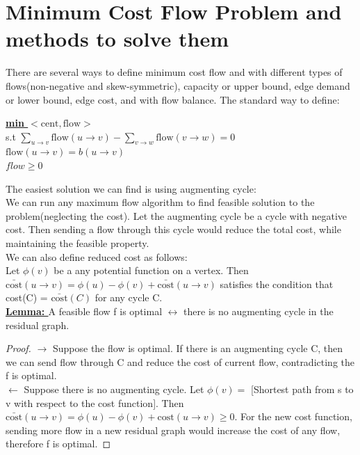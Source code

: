\documentclass{article}
\begin{document}
\section{Minimum Cost Flow Problem and methods to solve them}
There are several ways to define minimum cost flow and with different types of 
flows(non-negative and skew-symmetric), capacity or upper bound, edge demand or 
lower bound, edge cost, and with flow balance. The standard way to define:
\begin{center}
\begin{algorithm}
\textbf{\underline{min $< \text{cent}, \text{flow}>$}} \\
  s.t  $\sum \limits_{u \rightarrow v} \text{flow} 
  (u \rightarrow v) - \sum \limits_{v \rightarrow w} \text{flow} (v \rightarrow w)= 0 $  \\ 
  \qquad
       $\text{flow}(u \rightarrow v) = b(u \rightarrow v)$ \\ \qquad
       $flow \geq 0$
\end{algorithm}
\end{center}

The easiest solution we can find is using augmenting cycle: \\
We can run any maximum flow algorithm to find feasible solution to the 
problem(neglecting the cost). Let the augmenting cycle be a cycle with negative cost. 
Then sending a flow through this cycle would reduce the total cost, while 
maintaining the feasible property.  \\
We can also define reduced cost as follows: \\
Let $\phi(v)$ be a any potential function on a vertex. Then 
$\bar{\text{cost}}(u \rightarrow v) = \phi(u) - \phi(v) + \bar{\text{cost}} (u \rightarrow v)$ 
satisfies the condition that cost(C) =  $\bar{\text{cost}}(C)$ for any cycle C.\\

\textbf{\underline{Lemma: }} A feasible flow f is optimal $\leftrightarrow$ there 
is no augmenting cycle in the residual graph. \\

\begin{proof}
$\rightarrow$ Suppose the flow is optimal. If there is an augmenting cycle C, 
then we can send flow through C and reduce the cost of current flow, contradicting the f is optimal. \\
$\leftarrow$ Suppose there is no augmenting cycle. Let $\phi(v) = $ 
[Shortest path from s to v with respect to the cost function]. Then 
$\bar{\text{cost}}(u \rightarrow v) = \phi(u) - \phi(v) + \text{cost}(u \rightarrow v) \geq 0$. 
For the new cost function, sending more flow in a new residual graph would 
increase the cost of any flow, therefore f is optimal.
\end{proof}
\end{document}
